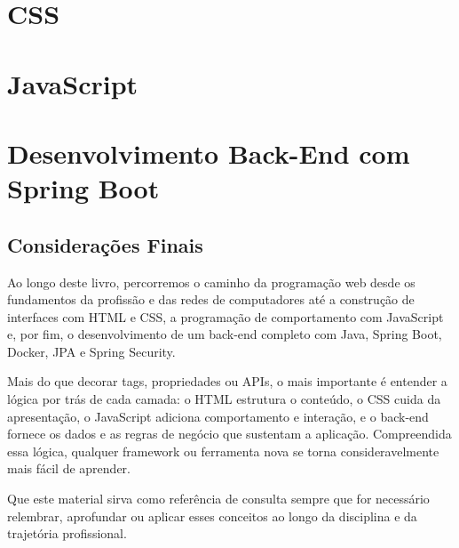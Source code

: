 \documentclass[12pt,a4paper,openany]{book}
\begin{document}
\part{CSS}




\part{JavaScript}







\part{Desenvolvimento Back-End com Spring Boot}









\backmatter
\chapter*{Considerações Finais}
Ao longo deste livro, percorremos o caminho da programação web desde os fundamentos da profissão e das redes de computadores até a construção de interfaces com HTML e CSS, a programação de comportamento com JavaScript e, por fim, o desenvolvimento de um back-end completo com Java, Spring Boot, Docker, JPA e Spring Security.

Mais do que decorar tags, propriedades ou APIs, o mais importante é entender a lógica por trás de cada camada: o HTML estrutura o conteúdo, o CSS cuida da apresentação, o JavaScript adiciona comportamento e interação, e o back-end fornece os dados e as regras de negócio que sustentam a aplicação. Compreendida essa lógica, qualquer framework ou ferramenta nova se torna consideravelmente mais fácil de aprender.

Que este material sirva como referência de consulta sempre que for necessário relembrar, aprofundar ou aplicar esses conceitos ao longo da disciplina e da trajetória profissional.
\end{document}
